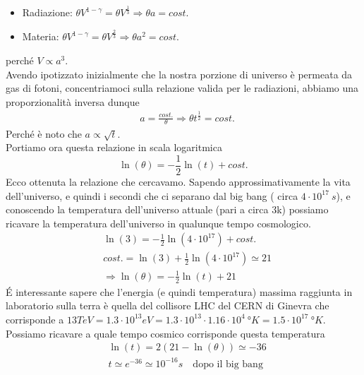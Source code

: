 \documentclass[
10pt, %
a4paper, %
oneside, %
headinclude,footinclude, %
BCOR5mm, %
]{scrartcl}
\begin{document}
\begin{itemize}
	\item Radiazione: \(\theta V^{1-\gamma} = \theta V^{\frac{1}{3}} \Rightarrow \theta a = cost.\)
	\item Materia: \(\theta V^{1-\gamma} = \theta V^{\frac{2}{3}} \Rightarrow \theta a^2 = cost.\)
\end{itemize}
perché $V \propto a^3$.\\
Avendo ipotizzato inizialmente  che la nostra porzione di universo è permeata da gas di fotoni, concentriamoci sulla relazione valida per le radiazioni, abbiamo una proporzionalità inversa dunque
\begin{align*}
	&a = \frac{cost.}{\theta} \Rightarrow  \theta t^{\frac{1}{2}} = cost.
\end{align*}
Perché è noto che \(a\propto \sqrt{t}\).\\
Portiamo ora questa relazione in scala logaritmica
\[\ln(\theta) = -\frac{1}{2}\ln(t) + cost.\]
Ecco ottenuta la relazione che cercavamo. Sapendo approssimativamente la vita dell'universo, e quindi i secondi che ci separano dal big bang ( circa $4\cdot 10^{17}\ s$), e conoscendo la temperatura dell'universo attuale (pari a circa 3\textdegree k) possiamo ricavare la temperatura dell'universo in qualunque tempo cosmologico. 
\begin{align*}
	&\ln(3) = -\frac{1}{2}\ln(4\cdot10^{17}) + cost.\\
	& cost. = \ln(3) + \frac{1}{2}\ln(4\cdot10^{17}) \simeq 21\\
	&\Rightarrow \ln(\theta) = -\frac{1}{2}\ln(t) + 21
\end{align*}
\'{E} interessante sapere che l'energia (e quindi temperatura) massima raggiunta in laboratorio sulla terra è quella del collisore LHC del CERN di Ginevra che corrisponde a $13 TeV = 1.3 \cdot 10^{13} eV = 1.3 \cdot 10^{13} \cdot 1.16 \cdot 10^4\ °K = 1.5\cdot 10^{17}\ °K $. Possiamo ricavare a quale tempo cosmico corrisponde questa temperatura
\begin{align*}
	& \ln(t) = 2(21 -\ln(\theta)) \simeq -36 \\
	& t \simeq e^{-36} \simeq 10^{-16}s\quad \text{dopo il big bang}
\end{align*}
\end{document}
